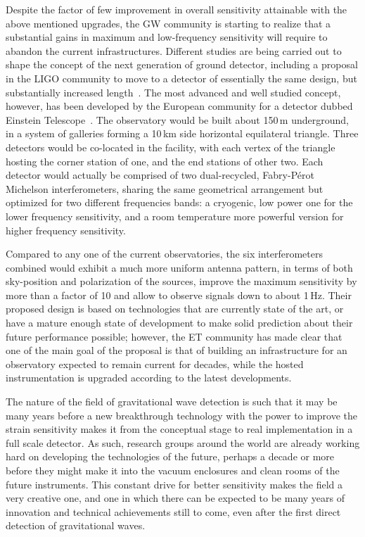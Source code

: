 Despite the factor of few improvement in overall sensitivity attainable with the above mentioned upgrades, the GW community is starting to realize that a substantial gains in maximum and low-frequency sensitivity will require to abandon the current infrastructures. 
Different studies are being carried out to shape the concept of the next generation of ground detector, including a proposal in the LIGO community to move to a detector of essentially the same design, but substantially increased length~\cite{Dwyer2015}.
The most advanced and well studied concept, however, has been developed by the European community for a detector dubbed Einstein Telescope~\cite{Punturo2010}.
The observatory would be built about 150\,m underground, in a system of galleries forming a 10\,km side horizontal equilateral triangle. Three detectors would be co-located in the facility, with each vertex of the triangle hosting the corner station of one, and the end stations of other two.
Each detector would actually be comprised of two dual-recycled, Fabry-P\'{e}rot Michelson  interferometers, sharing the same geometrical arrangement but optimized for two different frequencies bands: a cryogenic, low power one for the lower frequency sensitivity, and a room temperature more powerful version for higher frequency sensitivity.

Compared to any one of the current observatories, the six interferometers combined would exhibit a much more uniform antenna pattern, in terms of both sky-position and polarization of the sources, improve the maximum sensitivity by more than a factor of 10 and allow to observe signals down to about 1\,Hz. 
Their proposed design is based on technologies that are currently state of the art, or have a mature enough state of development to make solid prediction about their future performance possible; however, the ET community has made clear that one of the main goal of the proposal is that of building an infrastructure for an observatory expected to remain current for decades, while the hosted instrumentation is upgraded according to the latest developments.

The nature of the field of gravitational wave detection is such that it may be many years before a new breakthrough technology with the power to improve the strain sensitivity makes it from the conceptual stage to real implementation in a full scale detector. 
As such, research groups around the world are already working hard on developing the technologies of the future, perhaps a decade or more before they might make it into the vacuum enclosures and clean rooms of the future instruments. 
This constant drive for better sensitivity makes the field a very creative one, and one in which there can be expected to be many years of innovation and technical achievements still to come, even after the first direct detection of gravitational waves.